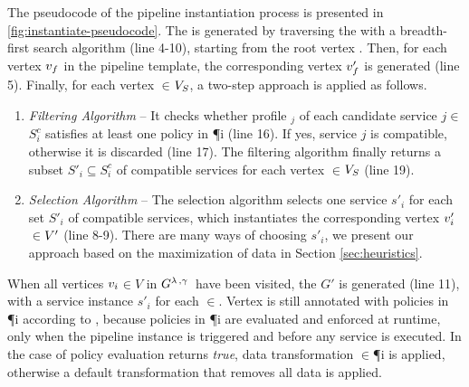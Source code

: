 {\color{OurColor}The pseudocode of the pipeline instantiation process is presented in \cref{fig:instantiate-pseudocode}.} The \pipelineInstance  is generated by traversing the \pipelineTemplate with a breadth-first search algorithm {\color{OurColor}(line 4-10)}, starting from the root vertex .
Then, for each vertex $v_{f}$ in the pipeline template, the corresponding vertex $v'_{f}$ is generated {\color{OurColor}(line 5)}.
Finally, for each vertex $\in$$V_S$, a two-step approach is applied as follows.

\begin{enumerate}
  \item \textit{Filtering Algorithm} -- It checks whether profile \profile$_j$ of each candidate service $\si{j}$$\in$$S^c_{i}$ satisfies at least one policy in \P{i} {\color{OurColor}(line 16)}. If yes, service $\si{j}$ is compatible, otherwise it is discarded {\color{OurColor}(line 17)}. The filtering algorithm finally returns a subset $S'_{i}$$\subseteq$$S^c_{i}$ of compatible services for each vertex $\in$$V_S$ {\color{OurColor}(line 19)}.
  \item \textit{Selection Algorithm} -- The selection algorithm selects one service $s'_i$ for each set $S'_{i}$ of compatible services, which instantiates the corresponding vertex $v'_{i}$$\in$$V'$ {\color{OurColor}(line 8-9)}. There are many ways of choosing $s'_i$, we present our approach based on the maximization of data \quality \emph{\q} in Section \ref{sec:heuristics}.
\end{enumerate}

When all vertices $v_{i}$$\in$$V$ in $G^{\lambda\,,\gamma\,}$ have been visited, the \pipelineInstance $G'$ is generated {\color{OurColor}(line 11)}, with a service instance $s'_i$ for each $\in$\Vp. Vertex  is still annotated with policies in \P{i} according to \myLambda, because policies in \P{i} are evaluated and enforced at runtime, only when the pipeline instance is triggered and before any service is executed. In the case of policy evaluation returns \emph{true}, data transformation \TP$\in$\P{i} is applied, otherwise a default transformation that removes all data is applied.

